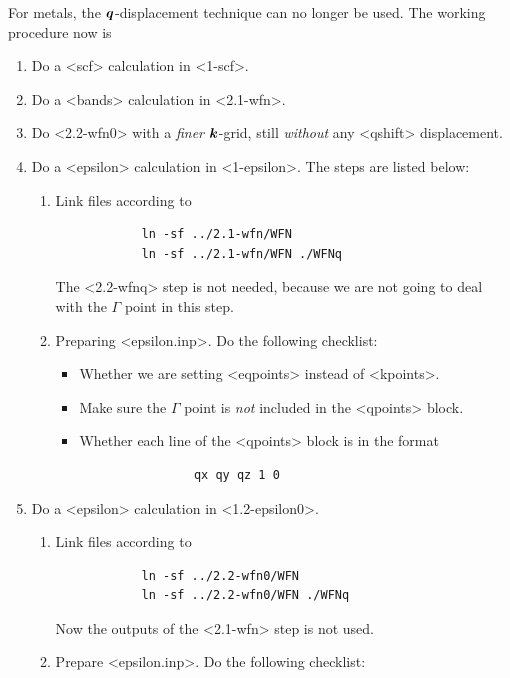 \documentclass[hyperref, a4paper]{report}
\def\texttt#1{<#1>}%
\newcommand{\shortcode}[1]{\texttt{#1}}
\begin{document}
For metals, the $\vb*{q}$-displacement technique can no longer be used.
The working procedure now is 
\begin{enumerate}
    \item Do a \shortcode{scf} calculation in \shortcode{1-scf}.
    \item Do a \shortcode{bands} calculation in \shortcode{2.1-wfn}.
    \item Do \shortcode{2.2-wfn0} with a \emph{finer} $\vb*{k}$-grid,
    still \emph{without} any \shortcode{qshift} displacement.
    \item Do a \shortcode{epsilon} calculation in \shortcode{1-epsilon}. The steps are listed below:
    \begin{enumerate}
        \item Link files according to 
        \begin{lstlisting}
            ln -sf ../2.1-wfn/WFN
            ln -sf ../2.1-wfn/WFN ./WFNq
        \end{lstlisting}
        The \shortcode{2.2-wfnq} step is not needed,
        because we are not going to deal with the $\Gamma$ point in this step.
        \item Preparing \shortcode{epsilon.inp}. Do the following checklist:
        \begin{itemize}
            \item Whether we are setting \shortcode{eqpoints} instead of \shortcode{kpoints}.
            \item Make sure the $\Gamma$ point is \emph{not} included in the \shortcode{qpoints} block.
            \item Whether each line of the \shortcode{qpoints} block is in the format 
            \begin{lstlisting}
                qx qy qz 1 0
            \end{lstlisting}
        \end{itemize}
    \end{enumerate}
    \item Do a \shortcode{epsilon} calculation in \shortcode{1.2-epsilon0}. 
    \begin{enumerate}
        \item Link files according to 
        \begin{lstlisting}
            ln -sf ../2.2-wfn0/WFN
            ln -sf ../2.2-wfn0/WFN ./WFNq
        \end{lstlisting}
        Now the outputs of the \shortcode{2.1-wfn} step is not used.
        \item Prepare \shortcode{epsilon.inp}. Do the following checklist:

\end{enumerate}
\end{enumerate}
\end{document}

